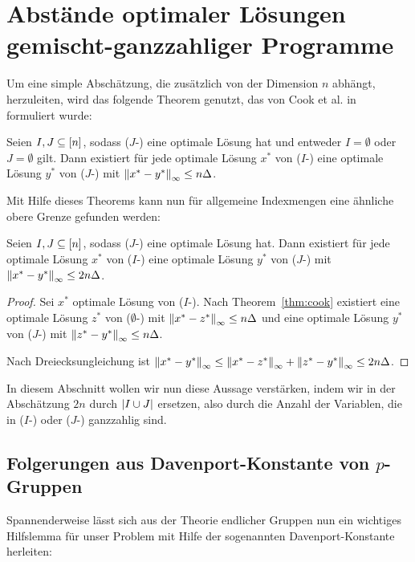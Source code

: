 
\section{Abstände optimaler Lösungen gemischt-ganzzahliger Programme}

Um eine simple Abschätzung, die zusätzlich von der Dimension $n$ abhängt, herzuleiten, wird das folgende Theorem genutzt, das von Cook et al. in~\cite[Theorem 1 und Bemerkung 1]{Cook1986} formuliert wurde:

\begin{theorem}[Cook et al., 1986]\label{thm:cook}
	Seien $I, J\subseteq[n]$, sodass ($J$-\MIPR) eine optimale Lösung hat und entweder $I=\emptyset$ oder $J=\emptyset$ gilt.
	Dann existiert für jede optimale Lösung $x^*$ von ($I$-\MIPR) eine optimale Lösung $y^*$ von ($J$-\MIPR) mit $\left\lVert x^*-y^*\right\rVert_\infty\leq n\Delta$.
\end{theorem}

Mit Hilfe dieses Theorems kann nun für allgemeine Indexmengen eine ähnliche obere Grenze gefunden werden:
\begin{corollary}
	Seien $I,J\subseteq[n]$, sodass ($J$-\MIPR) eine optimale Lösung
	hat.
	Dann existiert für jede optimale Lösung $x^*$ von ($I$-\MIPR) eine optimale Lösung $y^*$ von ($J$-\MIPR) mit $\left\lVert x^*-y^*\right\rVert_\infty\leq2 n\Delta$.
\end{corollary}
\begin{proof}
	Sei $x^*$ optimale Lösung von ($I$-\MIPR).
	Nach Theorem~\ref{thm:cook} existiert eine optimale Lösung $z^*$ von ($\emptyset$-\MIPR) mit $\left\lVert x^*-z^*\right\rVert_\infty\leq n\Delta$ und eine optimale Lösung $y^*$ von \mbox{($J$-\MIPR)} mit $\left\lVert z^*-y^*\right\rVert_\infty\leq n\Delta$.
	
	Nach Dreiecksungleichung ist $\left\lVert x^*-y^*\right\rVert_\infty\leq\left\lVert x^*-z^*\right\rVert_\infty+\left\lVert z^*-y^*\right\rVert_\infty\leq 2 n\Delta$.
\end{proof}

In diesem Abschnitt wollen wir nun diese Aussage verstärken, indem wir in der Abschätzung $2 n$ durch $\lvert I\cup J \rvert$ ersetzen, also durch die Anzahl der Variablen, die in ($I$-\MIPR) oder \mbox{($J$-\MIPR)} ganzzahlig sind.

\subsection{Folgerungen aus Davenport-Konstante von $p$-Gruppen}

Spannenderweise lässt sich aus der Theorie endlicher Gruppen nun ein wichtiges Hilfslemma für unser Problem mit Hilfe der sogenannten Davenport-Konstante herleiten:

